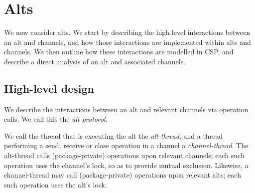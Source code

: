 \section{Alts}
\label{sec:alt}

\inlineScala

We now consider alts.  We start by describing the high-level interactions
between an alt and channels, and how those interactions are implemented within
alts and channels.  We then outline how these interactions are modelled in
CSP, and describe a direct analysis of an alt and associated channels.


\subsection{High-level design}

We describe the interactions between an alt and relevant channels via operation
calls.  We call this the \emph{alt protocol}. 

We call the thread that is executing the alt the \emph{alt-thread}, and a
thread performing a send, receive or close operation in a channel a
\emph{channel-thread}.  The alt-thread calls (package-private) operations upon
relevant channels; each such operation uses the channel's lock, so as to
provide mutual exclusion.  Likewise, a channel-thread may call (package-private)
operations upon relevant alts; each such operation uses the alt's lock.

